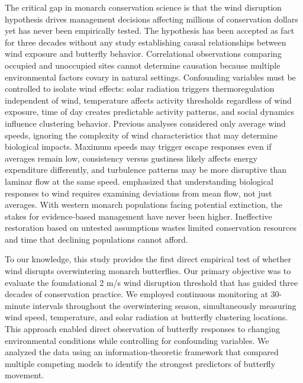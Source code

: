 The critical gap in monarch conservation science is that the wind disruption hypothesis drives management decisions affecting millions of conservation dollars yet has never been empirically tested. The hypothesis has been accepted as fact for three decades without any study establishing causal relationships between wind exposure and butterfly behavior. Correlational observations comparing occupied and unoccupied sites cannot determine causation because multiple environmental factors covary in natural settings. Confounding variables must be controlled to isolate wind effects: solar radiation triggers thermoregulation independent of wind, temperature affects activity thresholds regardless of wind exposure, time of day creates predictable activity patterns, and social dynamics influence clustering behavior. Previous analyses considered only average wind speeds, ignoring the complexity of wind characteristics that may determine biological impacts. Maximum speeds may trigger escape responses even if averages remain low, consistency versus gustiness likely affects energy expenditure differently, and turbulence patterns may be more disruptive than laminar flow at the same speed. \citet{nathanLongdistanceBiologicalTransport2005} emphasized that understanding biological responses to wind requires examining deviations from mean flow, not just averages. With western monarch populations facing potential extinction, the stakes for evidence-based management have never been higher. Ineffective restoration based on untested assumptions wastes limited conservation resources and time that declining populations cannot afford.

To our knowledge, this study provides the first direct empirical test of whether wind disrupts overwintering monarch butterflies. Our primary objective was to evaluate the foundational 2 m/s wind disruption threshold that has guided three decades of conservation practice. We employed continuous monitoring at 30-minute intervals throughout the overwintering season, simultaneously measuring wind speed, temperature, and solar radiation at butterfly clustering locations. This approach enabled direct observation of butterfly responses to changing environmental conditions while controlling for confounding variables. We analyzed the data using an information-theoretic framework that compared multiple competing models to identify the strongest predictors of butterfly movement.


